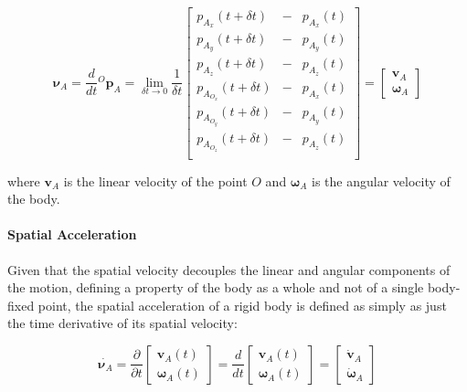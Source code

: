 \begin{equation}
    \boldsymbol{\nu} _A = \frac{d}{dt} {}^O\mathbf{p} _A =
    \lim _{\delta t \to 0} \frac{1}{\delta t}
    \begin{bmatrix}
        p _{A _x} (t + \delta t)     & - & p _{A _x} (t) \\
        p _{A _y} (t + \delta t)     & - & p _{A _y} (t) \\
        p _{A _z} (t + \delta t)     & - & p _{A _z} (t) \\
        p _{A _{O_x}} (t + \delta t) & - & p _{A _x} (t) \\
        p _{A _{O_y}} (t + \delta t) & - & p _{A _y} (t) \\
        p _{A _{O_z}} (t + \delta t) & - & p _{A _z} (t) \\
    \end{bmatrix}
    = \begin{bmatrix}
        \mathbf{v} _A \\
        \boldsymbol{\omega} _A
    \end{bmatrix}
\end{equation}

where $\mathbf{v} _A$ is the linear velocity of the point $O$ and $\boldsymbol{\omega} _A$ is the angular velocity of the body.

\paragraph{Spatial Acceleration} Given that the spatial velocity decouples the linear and angular components of the motion, defining a property of the body as a whole and not of a single body-fixed point, the spatial acceleration of a rigid body is defined as simply as just the time derivative of its spatial velocity:

\begin{equation}
    \dot{\boldsymbol{\nu} _A} = \frac{\partial}{\partial t} \begin{bmatrix}
        \mathbf{v} _A (t) \\
        \boldsymbol{\omega} _A (t)
    \end{bmatrix} = \frac{d}{dt} \begin{bmatrix}
        \mathbf{v} _A (t) \\
        \boldsymbol{\omega} _A (t)
    \end{bmatrix}
    =
    \begin{bmatrix}
        \dot{\mathbf{v}} _A \\
        \dot{\boldsymbol{\omega}} _A
    \end{bmatrix}
\end{equation}

